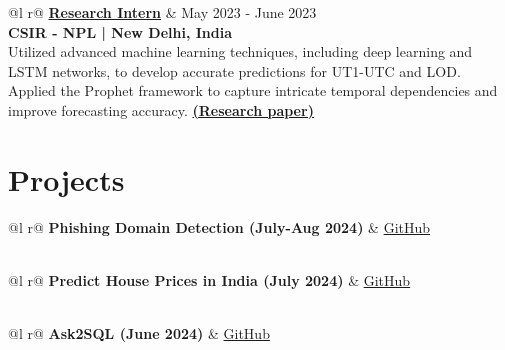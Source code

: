 \documentclass[a4paper,12pt]{article}
\begin{document}
\begin{tabularx}{\linewidth}{ @{}l r@{} }
\textbf{\underline{Research Intern}} & \hfill May 2023 - June 2023 \\[3.75pt]
\textbf{CSIR - NPL | New Delhi, India} \\[3.75pt]
{Utilized advanced machine learning techniques, including deep learning and LSTM networks, to develop accurate predictions for UT1-UTC and LOD. Applied the Prophet framework to capture intricate temporal dependencies and improve forecasting accuracy. \href{https://ieeexplore.ieee.org/document/10463236}{\textbf{(Research paper)}}} \\
\end{tabularx}




\section{\textbf{Projects}}

\begin{tabularx}{\linewidth}{ @{}l r@{} }
\textbf{Phishing Domain Detection (July-Aug 2024)} & \href{https://github.com/paridhi3/Phishing-Domain-Detection}{GitHub} \\[3.75pt]
 \\
\end{tabularx}

\begin{tabularx}{\linewidth}{ @{}l r@{} }
\textbf{Predict House Prices in India (July 2024)} & \hfill \href{https://github.com/paridhi3/Predict-House-Prices-in-India}{GitHub} \\[3.75pt]
  \\
\end{tabularx}

\begin{tabularx}{\linewidth}{ @{}l r@{} }
\textbf{Ask2SQL (June 2024)} & \hfill
\href{https://github.com/paridhi3/Ask2SQL.git}{GitHub} \\[3.75pt]
  \\
\end{tabularx}
\end{document}
